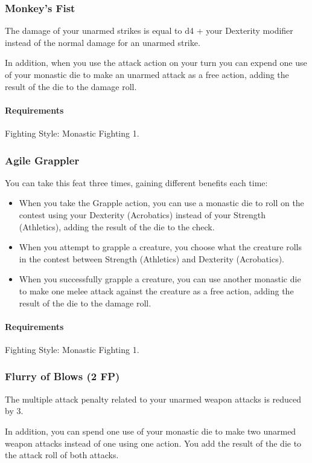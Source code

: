 \subsubsection{Monkey's Fist} \label{feat::monkeysfist}
    The damage of your unarmed strikes is equal to d4 + your Dexterity modifier instead of the normal damage for an unarmed strike.

    In addition, when you use the attack action on your turn you can expend one use of your monastic die to make an unarmed attack as a free action, adding the result of the die to the damage roll.
    \paragraph{Requirements} Fighting Style: Monastic Fighting 1.
\subsubsection{Agile Grappler} \label{feat::agilegrappler}
    You can take this feat three times, gaining different benefits each time:
    \begin{itemize}
        \item When you take the Grapple action, you can use a monastic die to roll on the contest using your Dexterity (Acrobatics) instead of your Strength (Athletics), adding the result of the die to the check.
        \item When you attempt to grapple a creature, you choose what the creature rolls in the contest between Strength (Athletics) and Dexterity (Acrobatics).
        \item When you successfully grapple a creature, you can use another monastic die to make one melee attack against the creature as a free action, adding the result of the die to the damage roll.
    \end{itemize}
    \paragraph{Requirements} Fighting Style: Monastic Fighting 1.
\subsubsection{Flurry of Blows (2 FP)} \label{feat::flurryofblows}
    The multiple attack penalty related to your unarmed weapon attacks is reduced by 3.

    In addition, you can spend one use of your monastic die to make two unarmed weapon attacks instead of one using one action.
    You add the result of the die to the attack roll of both attacks.
